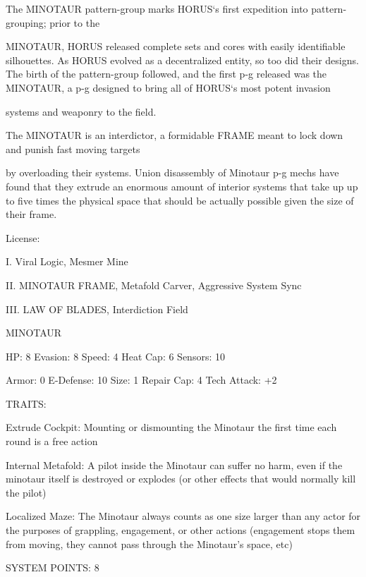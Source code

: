 The MINOTAUR pattern-group marks HORUS‘s first expedition into pattern-grouping; prior to the  

MINOTAUR, HORUS released complete sets and cores with easily identifiable silhouettes. As HORUS  
evolved as a decentralized entity, so too did their designs. The birth of the pattern-group followed, and the  
first p-g released was the MINOTAUR, a p-g designed to bring all of HORUS‘s most potent invasion  

systems and weaponry to the field.   

The MINOTAUR is an interdictor, a formidable FRAME meant to lock down and punish fast moving targets  

by overloading their systems. Union disassembly of Minotaur p-g mechs have found that they extrude an  
enormous amount of interior systems that take up up to five times the physical space that should be  
actually possible given the size of their frame.  

                                                    License:
 
I. Viral Logic, Mesmer Mine
 
II. MINOTAUR FRAME, Metafold Carver, Aggressive System Sync
 
III. LAW OF BLADES, Interdiction Field
 

                                                 MINOTAUR 

 HP: 8           Evasion: 8                            Speed: 4            Heat Cap: 6        Sensors: 10 

 Armor: 0        E-Defense: 10                         Size: 1             Repair Cap: 4      Tech Attack:  
                                                                                              +2 

                                                    TRAITS: 

 Extrude Cockpit: Mounting or dismounting the Minotaur the first time each round is a free action
 
 Internal Metafold: A pilot inside the Minotaur can suffer no harm, even if the minotaur itself is  
 destroyed or explodes (or other effects that would normally kill the pilot)
 
 Localized Maze: The Minotaur always counts as one size larger than any actor for the purposes of  
 grappling, engagement, or other actions (engagement stops them from moving, they cannot pass  
 through the Minotaur’s space, etc) 

                                             SYSTEM POINTS: 8 

